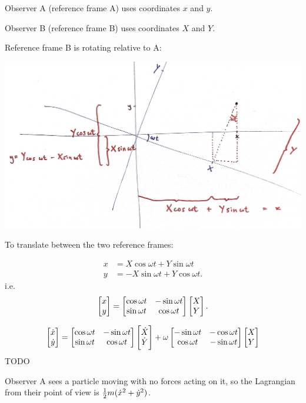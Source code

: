 Observer A (reference frame A) uses coordinates $x$ and $y$.

Observer B (reference frame B) uses coordinates $X$ and $Y$.

Reference frame B is rotating relative to A:

\begin{mdframed}
  \includegraphics[width=400pt]{img/physics--susskind--the-theoretical-minimum--1--the-nature-of-classical-mechanics--6--the-principle-of-least-action--28fe.png}
\end{mdframed}

To translate between the two reference frames:

\begin{align*}
    x &= X \cos \omega t + Y \sin \omega t \\
    y &= -X \sin \omega t + Y \cos \omega t.
  \end{align*}
  i.e.
\begin{align*}
  \begin{bmatrix}x\\y\end{bmatrix} = \begin{bmatrix}\cos \omega t & -\sin \omega t\\\sin \omega t & \cos \omega t\\ \end{bmatrix} \begin{bmatrix}X\\Y\end{bmatrix}.
\end{align*}

\begin{align*}
  \begin{bmatrix}\dot{x}\\\dot{y}\end{bmatrix} =
        \begin{bmatrix} \cos \omega t & -\sin \omega t\\\sin \omega t & \cos \omega t\\ \end{bmatrix} \begin{bmatrix}\dot{X}\\\dot{Y}\end{bmatrix} +
  \omega\begin{bmatrix}-\sin \omega t & -\cos \omega t\\\cos \omega t & -\sin \omega t\\ \end{bmatrix} \begin{bmatrix}X\\Y\end{bmatrix}
\end{align*}
TODO


Observer A sees a particle moving with no forces acting on it, so the Lagrangian from their point of view
is $\frac{1}{2}m(\dot{x}^2 + \dot{y}^2)$.

